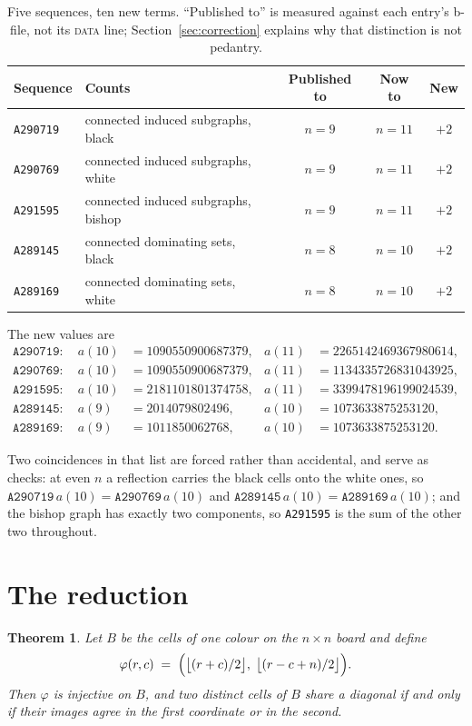 \documentclass[11pt]{article}
\newtheorem{theorem}{Theorem}
\theoremstyle{remark}
\newcommand{\seq}[1]{\texttt{#1}}
\begin{document}
\begin{table}[h]
\centering
\begin{tabular}{llccc}
\toprule
Sequence & Counts & Published to & Now to & New \\
\midrule
\seq{A290719} & connected induced subgraphs, black & $n=9$ & $n=11$ & $+2$ \\
\seq{A290769} & connected induced subgraphs, white & $n=9$ & $n=11$ & $+2$ \\
\seq{A291595} & connected induced subgraphs, bishop & $n=9$ & $n=11$ & $+2$ \\
\seq{A289145} & connected dominating sets, black    & $n=8$ & $n=10$ & $+2$ \\
\seq{A289169} & connected dominating sets, white    & $n=8$ & $n=10$ & $+2$ \\
\bottomrule
\end{tabular}
\caption{Five sequences, ten new terms. ``Published to'' is measured against
each entry's b-file, not its \textsc{data} line; Section~\ref{sec:correction}
explains why that distinction is not pedantry.}
\label{tab:results}
\end{table}

The new values are
\begin{align*}
\seq{A290719}: \quad a(10) &= 1090550900687379, &  a(11) &= 2265142469367980614,\\
\seq{A290769}: \quad a(10) &= 1090550900687379, &  a(11) &= 1134335726831043925,\\
\seq{A291595}: \quad a(10) &= 2181101801374758, &  a(11) &= 3399478196199024539,\\
\seq{A289145}: \quad a(9)  &= 2014079802496,    &  a(10) &= 1073633875253120,\\
\seq{A289169}: \quad a(9)  &= 1011850062768,    &  a(10) &= 1073633875253120.
\end{align*}

Two coincidences in that list are forced rather than accidental, and serve as
checks: at even $n$ a reflection carries the black cells onto the white ones, so
$\seq{A290719}\,a(10) = \seq{A290769}\,a(10)$ and
$\seq{A289145}\,a(10) = \seq{A289169}\,a(10)$; and the bishop graph has exactly
two components, so \seq{A291595} is the sum of the other two throughout.

\section{The reduction}

\begin{theorem}\label{thm:reduction}
Let $B$ be the cells of one colour on the $n \times n$ board and define
\[
  \varphi(r,c) \;=\; \Bigl( \bigl\lfloor (r+c)/2 \bigr\rfloor,\;
                            \bigl\lfloor (r-c+n)/2 \bigr\rfloor \Bigr).
\]
Then $\varphi$ is injective on $B$, and two distinct cells of $B$ share a
diagonal if and only if their images agree in the first coordinate or in the
second.
\end{theorem}
\end{document}
